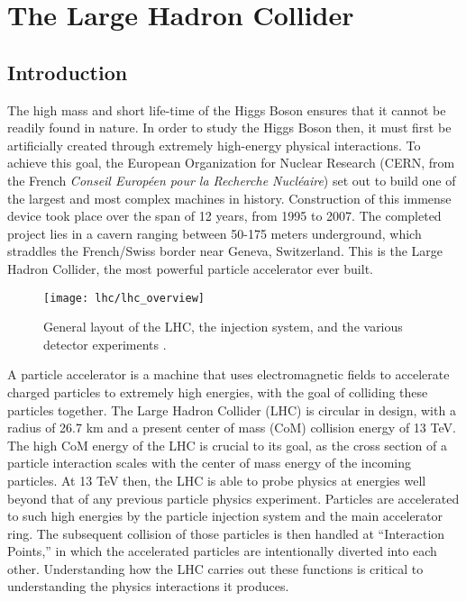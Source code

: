 \chapter{The Large Hadron Collider}\label{chapter:lhc}

\section{Introduction}

    The high mass and short life-time of the Higgs Boson ensures that it cannot be readily found in nature.
    In order to study the Higgs Boson then, it must first be artificially created through extremely high-energy physical interactions.
    To achieve this goal, the European Organization for Nuclear Research
        (CERN, from the French \textit{Conseil Européen pour la Recherche Nucléaire})
        set out to build one of the largest and most complex machines in history.
    Construction of this immense device took place over the span of 12 years, from 1995 to 2007.
    The completed project lies in a cavern ranging between 50-175 meters underground, which straddles the French/Swiss border near Geneva, Switzerland.
    This is the Large Hadron Collider, the most powerful particle accelerator ever built.

    \begin{figure}[h]
        \texttt{[image: lhc/lhc\_overview]}
        \caption{General layout of the LHC, the injection system, and the various detector experiments \cite{lhc_run2}.}
        \label{fig:lhc_overview}
    \end{figure}

    A particle accelerator is a machine that uses electromagnetic fields to accelerate charged particles to extremely high energies, with the goal of colliding these particles together.
    The Large Hadron Collider (LHC) is circular in design, with a radius of 26.7 km and a present center of mass (CoM) collision energy of 13 TeV.
    The high CoM energy of the LHC is crucial to its goal, as the cross section of a particle interaction scales with the center of mass energy of the incoming particles.
    At 13 TeV then, the LHC is able to probe physics at energies well beyond that of any previous particle physics experiment.
    Particles are accelerated to such high energies by the particle injection system and the main accelerator ring.
    The subsequent collision of those particles is then handled at ``Interaction Points,'' in which the accelerated particles are intentionally diverted into each other.
    Understanding how the LHC carries out these functions is critical to understanding the physics interactions it produces.



